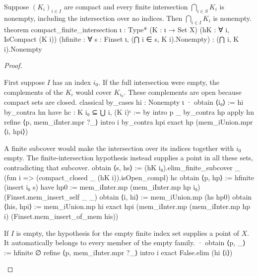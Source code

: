 \begin{theorem} \label{an1:thm:finite-compact-intersection-property}
  \begin{lean}{Suppose $(K_i)_{i\in I}$ are compact and every finite intersection $\bigcap_{i\in S}K_i$ is nonempty, including the intersection over no indices. Then $\bigcap_{i\in I}K_i$ is nonempty.}
    theorem compact_finite_intersection {ι : Type*} (K : ι → Set X)
        (hK : ∀ i, IsCompact (K i))
        (hfinite : ∀ s : Finset ι, (⋂ i ∈ s, K i).Nonempty) :
        (⋂ i, K i).Nonempty
  \end{lean}
\end{theorem}

\begin{proof}
  \begin{lean}{First suppose $I$ has an index $i_0$. If the full intersection were empty, the complements of the $K_i$ would cover $K_{i_0}$. These complements are open because compact sets are closed.}
    classical
    by_cases hi : Nonempty ι
    · obtain ⟨i₀⟩ := hi
      by_contra hn
      have hc : K i₀ ⊆ ⋃ i, (K i)ᶜ := by
        intro p _
        by_contra hp
        apply hn
        refine ⟨p, mem_iInter.mpr ?_⟩
        intro i
        by_contra hpi
        exact hp (mem_iUnion.mpr ⟨i, hpi⟩)
  \end{lean}

  \begin{lean}{A finite subcover would make the intersection over its indices together with $i_0$ empty. The finite-intersection hypothesis instead supplies a point in all these sets, contradicting that subcover.}
    obtain ⟨s, hs⟩ := (hK i₀).elim_finite_subcover _
      (fun i => (compact_closed _ (hK i)).isOpen_compl) hc
    obtain ⟨p, hp⟩ := hfinite (insert i₀ s)
    have hp0 := mem_iInter.mp (mem_iInter.mp hp i₀) (Finset.mem_insert_self _ _)
    obtain ⟨i, hi⟩ := mem_iUnion.mp (hs hp0)
    obtain ⟨his, hpi⟩ := mem_iUnion.mp hi
    exact hpi (mem_iInter.mp (mem_iInter.mp hp i) (Finset.mem_insert_of_mem his))
  \end{lean}

  \begin{lean}{If $I$ is empty, the hypothesis for the empty finite index set supplies a point of $X$. It automatically belongs to every member of the empty family.}
    · obtain ⟨p, _⟩ := hfinite ∅
      refine ⟨p, mem_iInter.mpr ?_⟩
      intro i
      exact False.elim (hi ⟨i⟩)
  \end{lean}

\end{proof}

